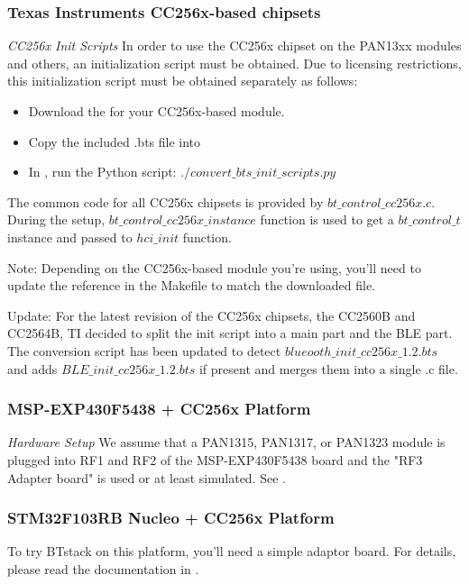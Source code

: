 \subsubsection{Texas Instruments CC256x-based chipsets}
\emph{CC256x Init Scripts} In order to use the CC256x chipset on the PAN13xx modules and others, an initialization script must be obtained. Due to licensing restrictions, this initialization script must be obtained separately as follows:
\begin{itemize}
\item Download the \BTSfile{} for your CC256x-based module.
\item Copy the included .bts file into 
\item In , run the Python script: $./convert\_bts\_init\_scripts.py$
\end{itemize}

The common code for all CC256x chipsets is provided by $bt\_control\_cc256x.c$. During the setup, $bt\_control\_cc256x\_instance$ function is used to get  a $bt\_control\_t$ instance and passed to $hci\_init$ function. 

Note: Depending on the CC256x-based module you're using, you'll need to update the reference  in the Makefile to match the downloaded file.

Update: For the latest revision of the CC256x chipsets, the CC2560B and CC2564B, TI decided to split the init script into a main part and the BLE part. The conversion script has been updated to detect $blueooth\_init\_cc256x\_1.2.bts$ and adds $BLE\_init\_cc256x\_1.2.bts$ if present and merges them into a single .c file.

\subsubsection{MSP-EXP430F5438 + CC256x Platform}
\label{platform:msp430}
\emph{Hardware Setup} We assume that a PAN1315, PAN1317, or PAN1323 module is plugged into RF1 and RF2 of the MSP-EXP430F5438 board and the "RF3 Adapter board" is used or at least simulated. See \UserGuide{}. 

\subsubsection{STM32F103RB Nucleo + CC256x Platform}
To try BTstack on this platform, you'll need a simple adaptor board. For details, please read the documentation in .

